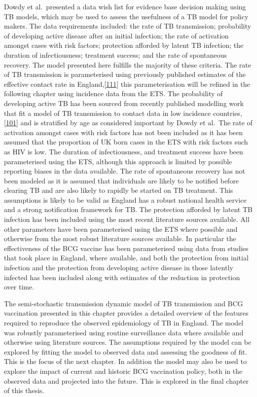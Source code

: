 \documentclass[11pt,twoside]{bristolthesis}
\begin{document}
  Dowdy et al.~presented a data wish list for evidence base decision making using TB models, which may be used to assess the usefulness of a TB model for policy makers. The data requirements included: the rate of TB transmission; probability of developing active disease after an initial infection; the rate of activation amongst cases with risk factors; protection afforded by latent TB infection; the duration of infectiousness; treatment success; and the rate of spontaneous recovery. The model presented here fulfills the majority of these criteria. The rate of TB transmission is parameterised using previously published estimates of the effective contact rate in England,{[}\protect\hyperlink{ref-Vynnycky1999}{111}{]} this parameterisation will be refined in the following chapter using incidence data from the ETS. The probability of developing active TB has been sourced from recently published modelling work that fit a model of TB transmission to contact data in low incidence countries,{[}\protect\hyperlink{ref-Ragonnet2017}{101}{]} and is stratified by age as considered important by Dowdy et al.~The rate of activation amongst cases with risk factors has not been included as it has been assumed that the proportion of UK born cases in the ETS with risk factors such as HIV is low. The duration of infectiousness, and treatment success have been parameterised using the ETS, although this approach is limited by possible reporting biases in the data available. The rate of spontaneous recovery has not been modeled as it is assumed that individuals are likely to be notified before clearing TB and are also likely to rapidly be started on TB treatment. This assumptions is likely to be valid as England has a robust national health service and a strong notification framework for TB. The protection afforded by latent TB infection has been included using the most recent literature sources available. All other parameters have been parameterised using the ETS where possible and otherwise from the most robust literature sources available. In particular the effectiveness of the BCG vaccine has been parameterised using data from studies that took place in England, where available, and both the protection from initial infection and the protection from developing active disease in those latently infected has been included along with estimates of the reduction in protection over time.
  
  The semi-stochastic transmission dynamic model of TB transmission and BCG vaccination presented in this chapter provides a detailed overview of the features required to reproduce the observed epidemiology of TB in England. The model was robustly parameterised using routine surveillance data where available and otherwise using literature sources. The assumptions required by the model can be explored by fitting the model to observed data and assessing the goodness of fit. This is the focus of the next chapter. In addition the model may also be used to explore the impact of current and historic BCG vaccination policy, both in the observed data and projected into the future. This is explored in the final chapter of this thesis.
  
\end{document}
